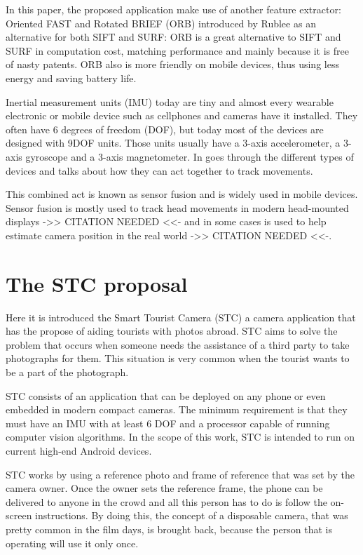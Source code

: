 \documentclass[12pt]{article}
\begin{document}
In this paper, the proposed application make use of another feature extractor: Oriented FAST and Rotated BRIEF (ORB) introduced by Rublee \cite{Rublee:11} as an alternative for both SIFT and SURF: ORB is a great alternative to SIFT and SURF in computation cost, matching performance and mainly because it is free of nasty patents. ORB also is more friendly on mobile devices, thus using less energy and saving battery life.

Inertial measurement units (IMU) today are tiny and almost every wearable electronic or mobile device such as cellphones and cameras have it installed. They often have 6 degrees of freedom (DOF), but today most of the devices are designed with 9DOF units. Those units usually have a 3-axis accelerometer, a 3-axis gyroscope and a 3-axis magnetometer. In \cite{Woodman:07} goes through the different types of devices and talks about how they can act together to track movements.

This combined act is known as sensor fusion and is widely used in mobile devices. Sensor fusion is mostly used to track head movements in modern head-mounted displays ->> CITATION NEEDED <<- and in some cases is used to help estimate camera position in the real world ->> CITATION NEEDED <<-.

\section{The STC proposal}
Here it is introduced the Smart Tourist Camera (STC) a camera application that has the propose of aiding tourists with photos abroad. STC aims to solve the problem that occurs when someone needs the assistance of a third party to take photographs for them. This situation is very common when the tourist wants to be a part of the photograph.

STC consists of an application that can be deployed on any phone or even embedded in modern compact cameras. The minimum requirement is that they must have an IMU with at least 6 DOF and a processor capable of running computer vision algorithms. In the scope of this work, STC is intended to run on current high-end Android devices.

STC works by using a reference photo and frame of reference that was set by the camera owner. Once the owner sets the reference frame, the phone can be delivered to anyone in the crowd and all this person has to do is follow the on-screen instructions. By doing this, the concept of a disposable camera, that was pretty common in the film days, is brought back, because the person that is operating will use it only once.
\end{document}
